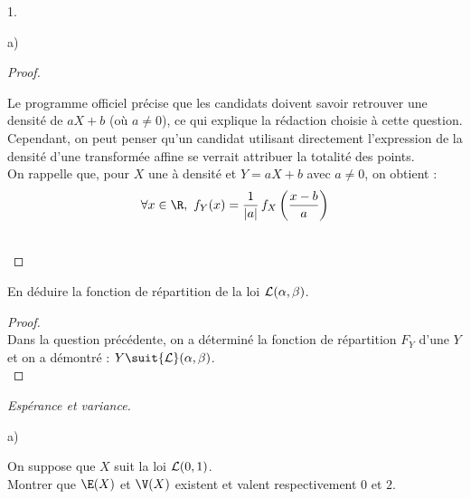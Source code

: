 \documentclass[11pt]{article}%
\begin{document}
\begin{noliste}{1.}
\begin{noliste}{a)}
\begin{proof}
        
    \begin{remark}
      Le programme officiel précise que les candidats doivent savoir
      retrouver une densité de $aX+b$ (où $a \neq 0$), ce qui 
      explique la rédaction choisie à cette question.\\
      Cependant, on peut penser qu'un candidat utilisant directement
      l'expression de la densité d'une transformée affine se verrait 
      attribuer la totalité des points.\\
      On rappelle que, pour $X$ une \var à densité et $Y=aX+b$ avec
      $a \neq 0$, on obtient :
      \[
        \forall x \in \R, \ f_Y(x) = \dfrac{1}{\vert a \vert} \, 
        f_X\left( \dfrac{x-b}{a}\right)
      \]
    \end{remark}~\\[-1.4cm]
  \end{proof}
  
  
  
  \newpage
  
  
  
\item En déduire la fonction de répartition de la loi ${\cal
    L}(\alpha,\beta)$.
  
  \begin{proof}~\\%
    Dans la question précédente, on a déterminé la fonction de
    répartition $F_Y$ d'une \var $Y$ et on a démontré : $Y \suit {\cal
      L}(\alpha, \beta)$.%
    ~\\[-1cm]
  \end{proof}
\end{noliste}

\item {\em Espérance et variance.}
  \begin{noliste}{a)}
  \setlength{\itemsep}{2mm} %
  \item On suppose que $X$ suit la loi ${\cal L}(0,1)$.\\
    Montrer que $\E(X)$ et $\V(X)$ existent et valent respectivement
    $0$ et $2$.


\end{noliste}
\end{noliste}
\end{document}
